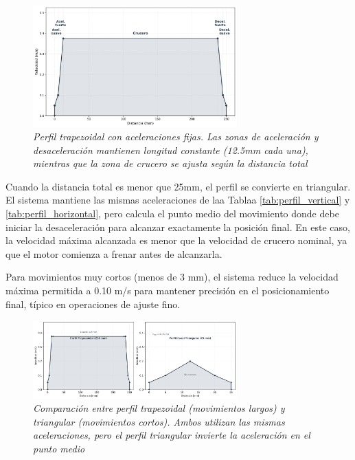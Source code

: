 \begin{figure}[H]
    \centering
    \includegraphics[width=0.7\textwidth]{imagenes/perfil_trapezoidal_velocidad.png}
    \caption{\textit{Perfil trapezoidal con aceleraciones fijas. Las zonas de aceleración y desaceleración mantienen longitud constante (12.5mm cada una), mientras que la zona de crucero se ajusta según la distancia total}}
    \label{fig:perfil_trapezoidal}
\end{figure}

Cuando la distancia total es menor que 25mm, el perfil se convierte en triangular. El sistema mantiene las mismas aceleraciones de laa Tablaa \ref{tab:perfil_vertical} y \ref{tab:perfil_horizontal}, pero calcula el punto medio del movimiento donde debe iniciar la desaceleración para alcanzar exactamente la posición final. En este caso, la velocidad máxima alcanzada es menor que la velocidad de crucero nominal, ya que el motor comienza a frenar antes de alcanzarla. 

Para movimientos muy cortos (menos de 3 mm), el sistema reduce la velocidad máxima permitida a 0.10 m/s para mantener precisión en el posicionamiento final, típico en operaciones de ajuste fino.

\begin{figure}[H]
    \centering
    \includegraphics[width=0.7\textwidth]{imagenes/perfil_trapezoidal_triangular.png}
    \caption{\textit{Comparación entre perfil trapezoidal (movimientos largos) y triangular (movimientos cortos). Ambos utilizan las mismas aceleraciones, pero el perfil triangular invierte la aceleración en el punto medio}}
    \label{fig:perfil_comparacion}
\end{figure}

